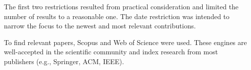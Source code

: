 The first two restrictions resulted from practical consideration and limited the number of results to a reasonable one.
The date restriction was intended to narrow the focus to the newest and most relevant contributions.

To find relevant papers, Scopus and Web of Science were used.
These engines are well-accepted in the scientific community and index research from most publishers (e.g., Springer, ACM, IEEE).
